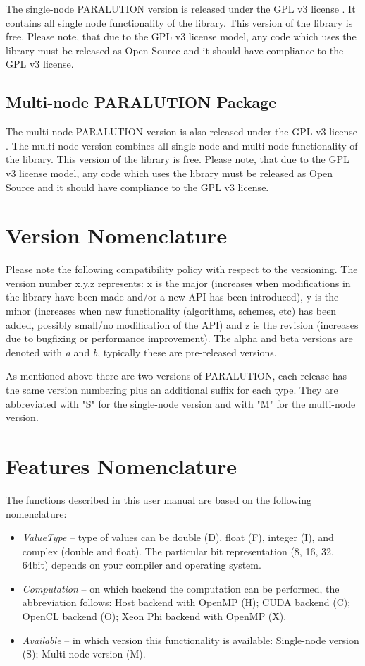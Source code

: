 The single-node PARALUTION version is released under the {GPL} v3 license \cite{gpl}. It contains all single node functionality of the library. This version of the library is free. Please note, that due to the {GPL} v3 license model, any code which uses the library must be released as Open Source and it should have compliance to the {GPL} v3 license.

\subsection{Multi-node PARALUTION Package}

The multi-node PARALUTION version is also released under the {GPL} v3 license \cite{gpl}. The multi node version combines all single node and multi node functionality of the library. This version of the library is free. Please note, that due to the {GPL} v3 license model, any code which uses the library must be released as Open Source and it should have compliance to the {GPL} v3 license.

\section{Version Nomenclature}

Please note the following compatibility policy with respect to the versioning. The version number {x.y.z} represents: x is the major (increases when modifications in the library have been made and/or a new API has been introduced), y is the minor (increases when new functionality (algorithms, schemes, etc) has been added, possibly small/no modification of the API) and z is the revision (increases due to bugfixing or performance improvement). The alpha and beta versions are denoted with {\it a} and {\it b}, typically these are pre-released versions. 

As mentioned above there are two versions of PARALUTION, each release has the same version numbering plus an additional suffix for each type. They are abbreviated with "S" for the single-node version and with "M" for the multi-node version.

\section{Features Nomenclature}

The functions described in this user manual are based on the following nomenclature:
\begin{itemize}
  \item \emph{ValueType} -- type of values can be double (D), float (F), integer (I), and complex (double and float). The particular bit representation (8, 16, 32, 64bit) depends on your compiler and operating system.
  \item \emph{Computation} -- on which backend the computation can be performed, the abbreviation follows: Host backend with OpenMP
(H); CUDA backend (C); OpenCL backend (O); Xeon Phi backend with OpenMP (X). 
  \item \emph{Available} -- in which version this functionality is available: Single-node version (S); Multi-node version (M).
\end{itemize}

